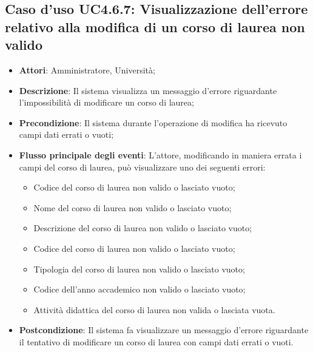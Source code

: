 \subsection{Caso d'uso \texorpdfstring{UC4.6.7}{UC4.6.7}: Visualizzazione dell'errore relativo alla modifica di un corso di laurea non valido}
\begin{itemize}
\item \textbf{Attori}: Amministratore, Università;
\item \textbf{Descrizione}: Il sistema visualizza un messaggio d'errore riguardante l'impossibilità di modificare un corso di laurea;

\item \textbf{Precondizione}: Il sistema durante l'operazione di modifica ha ricevuto campi dati errati o vuoti;

\item \textbf{Flusso principale degli eventi}: L'attore, modificando in maniera errata i campi del corso di laurea, può visualizzare uno dei seguenti errori: \begin{itemize} 
\item Codice del corso di laurea non valido o lasciato vuoto; 
\item Nome del corso di laurea non valido o lasciato vuoto; 
\item Descrizione del corso di laurea non valido o lasciato vuoto; 
\item Codice del corso di laurea non valido o lasciato vuoto; 
\item Tipologia del corso di laurea non valido o lasciato vuoto; 
\item Codice dell'anno accademico non valido o lasciato vuoto; 
\item Attività didattica del corso di laurea non valida o lasciata vuota.
\end{itemize}
\item \textbf{Postcondizione}: Il sistema fa visualizzare un messaggio d'errore riguardante il tentativo di modificare un corso di laurea con campi dati errati o vuoti.

\end{itemize}
